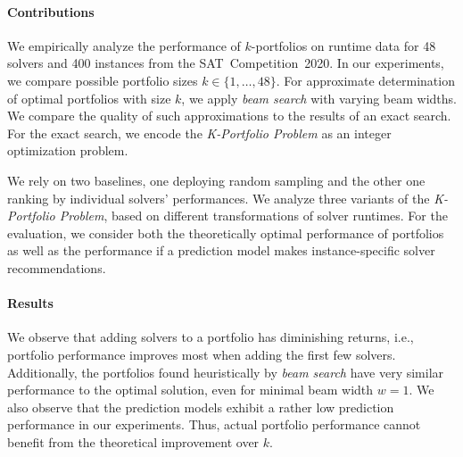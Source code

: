 \documentclass[conference]{IEEEtran}
\begin{document}
\paragraph{Contributions}

We empirically analyze the performance of $k$-portfolios on runtime data for 48 solvers and 400 instances from the SAT~Competition~2020. 
In our experiments, we compare possible portfolio sizes $k \in \{1, \dots, 48\}$. 
For approximate determination of optimal portfolios with size $k$, we apply \emph{beam search} with varying beam widths. %
We compare the quality of such approximations to the results of an exact search.
For the exact search, we encode the \emph{K-Portfolio Problem} as an integer optimization problem. 

We rely on two baselines, one deploying random sampling and the other one ranking by individual solvers' performances. %
We analyze three variants of the \emph{K-Portfolio Problem}, based on different transformations of solver runtimes. %
For the evaluation, we consider both the theoretically optimal performance of portfolios %
as well as the performance if a prediction model makes instance-specific solver recommendations. %

\paragraph{Results}

We observe that adding solvers to a portfolio has diminishing returns, i.e., portfolio performance improves most when adding the first few solvers. %
Additionally, the portfolios found heuristically by \emph{beam search} have very similar performance to the optimal solution, even for minimal beam width $w=1$. %
We also observe that the prediction models exhibit a rather low prediction performance in our experiments. %
Thus, actual portfolio performance cannot benefit from the theoretical improvement over $k$. 
\end{document}
